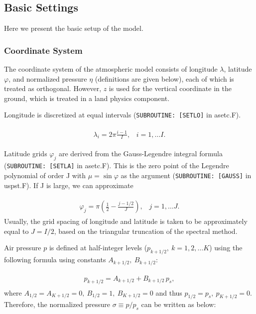 \hypertarget{basic-settings}{%
\subsection{Basic Settings}\label{basic-settings}}

Here we present the basic setup of the model.

\hypertarget{coordinate-system}{%
\subsubsection{Coordinate System}\label{coordinate-system}}

The coordinate system of the atmospheric model consists of longitude \(\lambda\), latitude \(\varphi\), and normalized pressure \(\eta\) (definitions are given below), each of which is treated as
orthogonal. However, \(z\) is used for the vertical coordinate in the ground, which is treated in a land physics component.

Longitude is discretized at equal intervals (\texttt{SUBROUTINE:~{[}SETLO{]}} in asetc.F).

\begin{eqnarray}
\begin{aligned}
\lambda_i = 2 \pi \frac{i-1}{I},  \;\;\; i = 1, \ldots I.\end{aligned}
\end{eqnarray}

Latitude grids \(\varphi_j\) are derived from the Gauss-Legendre integral formula (\texttt{SUBROUTINE:~{[}SETLA{]}} in asetc.F). This is the zero point of the Legendre polynomial of order J with
\(\mu = \sin \varphi\) as the argument (\texttt{SUBROUTINE:~{[}GAUSS{]}} in uspst.F). If J is large, we can approximate

\begin{eqnarray}
\begin{aligned}
\varphi_j =  \pi \left( \frac{1}{2}- \frac{j-1/2}{J} \right), \;\;\; j = 1, \ldots J.\end{aligned}
\end{eqnarray} Usually, the grid spacing of longitude and latitude is taken to be approximately equal to \(J = I/2\), based on the triangular truncation of the spectral method.

Air pressure \(p\) is defined at half-integer levels (\(p_{k+1/2},\ k = 1, 2, \ldots K\)) using the following formula using constants \(A_{k+1/2},\ B_{k+1/2}\):

\begin{eqnarray}
\begin{aligned}
p_{k+1/2} = A_{k+1/2} +B_{k+1/2}\,p_s,\end{aligned}
\end{eqnarray} where \(A_{1/2}=A_{K+1/2}=0,\ B_{1/2}=1,\ B_{K+1/2}=0\) and thus \(p_{1/2}=p_s,\ p_{K+1/2}=0\). Therefore, the normalized pressure \(\sigma\equiv p/p_s\) can be written as below:

